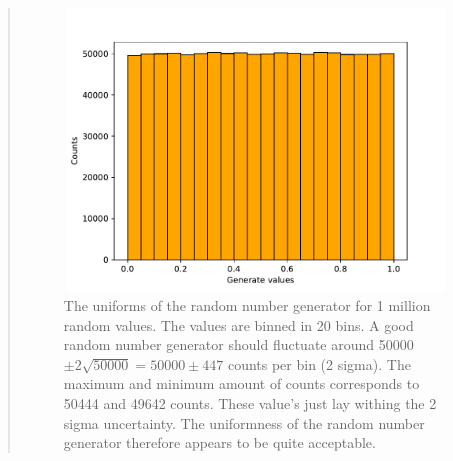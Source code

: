 \begin{quote}
\newpage
\begin{figure}[!ht]
\centering
\includegraphics[width=12cm, height=7.5cm]{./Plots/1_hist_uniformnes.pdf}
\caption{The uniforms of the random number generator for 1 million random values. The values are binned in 20 bins. A good random number generator should fluctuate around 50000 $\pm 2\sqrt{50000} = 50000 \pm 447 $ counts per bin (2 sigma). The maximum and minimum amount of counts corresponds to  50444 and 49642 counts. These value's just lay withing the 2 sigma uncertainty.  The uniformness of the random number generator therefore appears to be quite acceptable.  }
\end{figure}
\end{quote}


%


%












